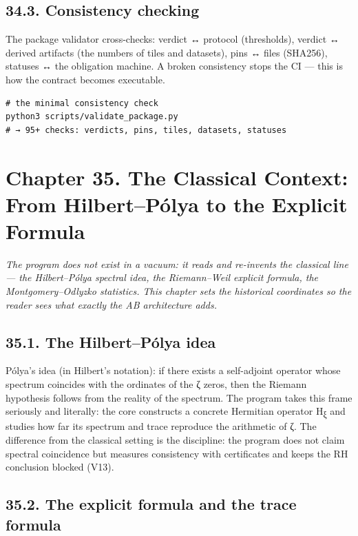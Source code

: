 \documentclass[11pt,a4paper]{article}
\begin{document}
\subsection{34.3. Consistency checking}

The package validator cross-checks: verdict ↔ protocol (thresholds), verdict ↔ derived artifacts (the numbers of tiles and datasets), pins ↔ files (SHA256), statuses ↔ the obligation machine. A broken consistency stops the CI — this is how the contract becomes executable.

\begin{verbatim}
# the minimal consistency check
python3 scripts/validate_package.py
# → 95+ checks: verdicts, pins, tiles, datasets, statuses
\end{verbatim}

\section{Chapter 35. The Classical Context: From Hilbert–Pólya to the Explicit Formula}

\noindent\textit{\color{copper}The program does not exist in a vacuum: it reads and re-invents the classical line — the Hilbert–Pólya spectral idea, the Riemann–Weil explicit formula, the Montgomery–Odlyzko statistics. This chapter sets the historical coordinates so the reader sees what exactly the AB architecture adds.}

\subsection{35.1. The Hilbert–Pólya idea}

Pólya's idea (in Hilbert's notation): if there exists a self-adjoint operator whose spectrum coincides with the ordinates of the ζ zeros, then the Riemann hypothesis follows from the reality of the spectrum. The program takes this frame seriously and literally: the core constructs a concrete Hermitian operator H\textsubscript{ξ} and studies how far its spectrum and trace reproduce the arithmetic of ζ. The difference from the classical setting is the discipline: the program does not claim spectral coincidence but measures consistency with certificates and keeps the RH conclusion blocked (V13).

\subsection{35.2. The explicit formula and the trace formula}
\end{document}
